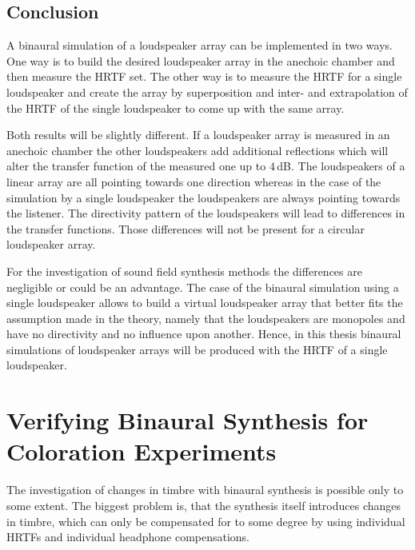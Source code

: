 \subsection{Conclusion}
%
A binaural simulation of a loudspeaker array can be implemented in two ways. One way is
to build the desired loudspeaker array in the anechoic chamber and then measure
the \ac{HRTF} set. The other way is to measure the \ac{HRTF} for a single loudspeaker and
create the array by superposition and inter- and extrapolation of the \ac{HRTF} of the single
loudspeaker to come up with the same array.

Both results will be slightly different. If a loudspeaker array is measured in
an anechoic chamber the other loudspeakers add additional reflections which will
alter the transfer function of the measured one up to
$4$\,dB.\autocite{Volk2010c} The loudspeakers of a linear array are all pointing
towards one direction whereas in the case of the simulation by a single
loudspeaker the loudspeakers are always pointing towards the listener. The directivity
pattern of the loudspeakers will lead to differences in the transfer
functions. Those differences will not be present for a circular loudspeaker array.

For the investigation of sound field synthesis methods the differences are
negligible or could be an advantage. The case of the binaural simulation using a single
loudspeaker allows to build a virtual loudspeaker array that better fits the
assumption made in the theory, namely that the loudspeakers are monopoles and
have no directivity and no influence upon another.
Hence, in this thesis binaural simulations of loudspeaker arrays will be produced
with the \ac{HRTF} of a single loudspeaker.


\section[Coloration Experiments]{Verifying Binaural Synthesis for Coloration Experiments}
\label{sec:verifying_binaural_synthesis_for_coloration_experiments}

The investigation of changes in timbre with binaural synthesis is possible
only to some extent. The biggest problem is, that the synthesis itself introduces
changes in timbre, which can only be compensated for to some degree by using
individual \acp{HRTF} and individual headphone compensations.\autocite[Compare for
example][]{Masiero2012}

